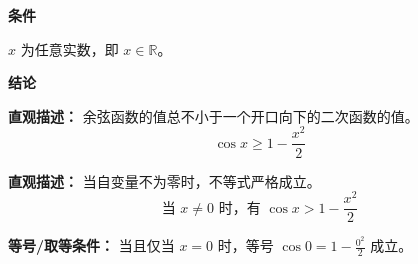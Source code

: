 \begin{statementbox}

\textbf{\textcolor{CStatement}{条件}}
\begin{description}[style=nextline, leftmargin=2.8em, labelsep=0.5em, itemsep=0.35em]
    \item[\textbf{\textcolor{CStatement}{条件 1（自变量范围）：}}] $x$ 为任意实数，即 $x \in \mathbb{R}$。
\end{description}

\textbf{\textcolor{CStatement}{结论}}
\begin{description}[style=nextline, leftmargin=2.8em, labelsep=0.5em, itemsep=0.45em]
    \item[\textbf{\textcolor{CStatement}{结论一（余弦下界）：}}]
    \textbf{\textcolor{CStatement}{直观描述：}} 余弦函数的值总不小于一个开口向下的二次函数的值。
    \[
    \cos x \geq 1 - \frac{x^{2}}{2}
    \]

    \item[\textbf{\textcolor{CStatement}{推广结论（严格不等式）：}}]
    \textbf{\textcolor{CStatement}{直观描述：}} 当自变量不为零时，不等式严格成立。
    \[
    \text{当 } x \neq 0 \text{ 时，有 } \cos x > 1 - \frac{x^{2}}{2}
    \]
\end{description}

\textbf{\textcolor{CStatement}{等号/取等条件：}} 当且仅当 $x = 0$ 时，等号 $\cos 0 = 1 - \frac{0^{2}}{2}$ 成立。

\end{statementbox}
